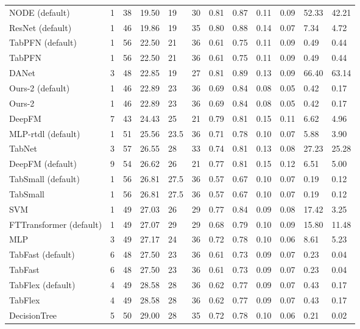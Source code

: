 \begin{tabular}{lllllrllllll}
NODE (default) & 1 & 38 & 19.50 & 19 & 30 & 0.81 & 0.87 & 0.11 & 0.09 & 52.33 & 42.21 \\
ResNet (default) & 1 & 46 & 19.86 & 19 & 35 & 0.80 & 0.88 & 0.14 & 0.07 & 7.34 & 4.72 \\
TabPFN (default) & 1 & 56 & 22.50 & 21 & 36 & 0.61 & 0.75 & 0.11 & 0.09 & 0.49 & 0.44 \\
TabPFN & 1 & 56 & 22.50 & 21 & 36 & 0.61 & 0.75 & 0.11 & 0.09 & 0.49 & 0.44 \\
DANet & 3 & 48 & 22.85 & 19 & 27 & 0.81 & 0.89 & 0.13 & 0.09 & 66.40 & 63.14 \\
Ours-2 (default) & 1 & 46 & 22.89 & 23 & 36 & 0.69 & 0.84 & 0.08 & 0.05 & 0.42 & 0.17 \\
Ours-2 & 1 & 46 & 22.89 & 23 & 36 & 0.69 & 0.84 & 0.08 & 0.05 & 0.42 & 0.17 \\
DeepFM & 7 & 43 & 24.43 & 25 & 21 & 0.79 & 0.81 & 0.15 & 0.11 & 6.62 & 4.96 \\
MLP-rtdl (default) & 1 & 51 & 25.56 & 23.5 & 36 & 0.71 & 0.78 & 0.10 & 0.07 & 5.88 & 3.90 \\
TabNet & 3 & 57 & 26.55 & 28 & 33 & 0.74 & 0.81 & 0.13 & 0.08 & 27.23 & 25.28 \\
DeepFM (default) & 9 & 54 & 26.62 & 26 & 21 & 0.77 & 0.81 & 0.15 & 0.12 & 6.51 & 5.00 \\
TabSmall (default) & 1 & 56 & 26.81 & 27.5 & 36 & 0.57 & 0.67 & 0.10 & 0.07 & 0.19 & 0.12 \\
TabSmall & 1 & 56 & 26.81 & 27.5 & 36 & 0.57 & 0.67 & 0.10 & 0.07 & 0.19 & 0.12 \\
SVM & 1 & 49 & 27.03 & 26 & 29 & 0.77 & 0.84 & 0.09 & 0.08 & 17.42 & 3.25 \\
FTTransformer (default) & 1 & 49 & 27.07 & 29 & 29 & 0.68 & 0.79 & 0.10 & 0.09 & 15.80 & 11.48 \\
MLP & 3 & 49 & 27.17 & 24 & 36 & 0.72 & 0.78 & 0.10 & 0.06 & 8.61 & 5.23 \\
TabFast (default) & 6 & 48 & 27.50 & 23 & 36 & 0.61 & 0.73 & 0.09 & 0.07 & 0.23 & 0.04 \\
TabFast & 6 & 48 & 27.50 & 23 & 36 & 0.61 & 0.73 & 0.09 & 0.07 & 0.23 & 0.04 \\
TabFlex (default) & 4 & 49 & 28.58 & 28 & 36 & 0.62 & 0.77 & 0.09 & 0.07 & 0.43 & 0.17 \\
TabFlex & 4 & 49 & 28.58 & 28 & 36 & 0.62 & 0.77 & 0.09 & 0.07 & 0.43 & 0.17 \\
DecisionTree & 5 & 50 & 29.00 & 28 & 35 & 0.72 & 0.78 & 0.10 & 0.06 & 0.21 & 0.02 \\

\end{tabular}
